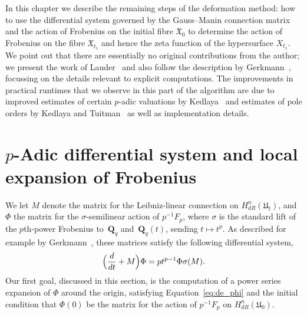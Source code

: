
In this chapter we describe the remaining steps of the deformation method:  
how to use the differential system governed by the Gauss--Manin connection 
matrix and the action of Frobenius on the initial fibre $\mathfrak{X}_0$ 
to determine the action of Frobenius on the fibre $\mathfrak{X}_{t_1}$ 
and hence the zeta function of the hypersurface $X_{t_1}$.
We point out that there are essentially no original contributions from the 
author;  we present the work of Lauder~\citep{Lau04} and also follow the 
description by Gerkmann~\citep{Gerkmann2007}, focussing on the details 
relevant to explicit computations.  The improvements in practical runtimes 
that we observe in this part of the algorithm are due to improved estimates 
of certain $p$-adic valuations by Kedlaya~\citep{Kedlaya2010} and estimates 
of pole orders by Kedlaya and Tuitman~\citep{KedlayaTuitman2012} as well as 
implementation details.

\section{$p$-Adic differential system and local expansion of Frobenius}

We let $M$ denote the matrix for the Leibniz-linear connection on 
$H_{dR}^n(\mathfrak{U}_t)$, and $\Phi$ the matrix for the $\sigma$-semilinear 
action of $p^{-1} F_p$, where $\sigma$ is the standard lift of the $p$th-power 
Frobenius to~$\mathbf{Q}_q$ and~$\mathbf{Q}_q(t)$, sending $t \mapsto t^p$.  
As described for example by Gerkmann~\citep[\S 5]{Gerkmann2007}, these 
matrices satisfy the following differential system,
\begin{equation} \label{eq:de_phi}
\Bigl(\frac{d}{dt} + M\Bigr) \Phi = p t^{p-1} \Phi \sigma(M).
\end{equation}
Our first goal, discussed in this section, is the computation of 
a power series expansion of $\Phi$ around the origin, satisfying 
Equation~\eqref{eq:de_phi} and the initial condition that $\Phi(0)$ 
be the matrix for the action of $p^{-1} F_p$ on $H_{dR}^n(\mathfrak{U}_0)$.

